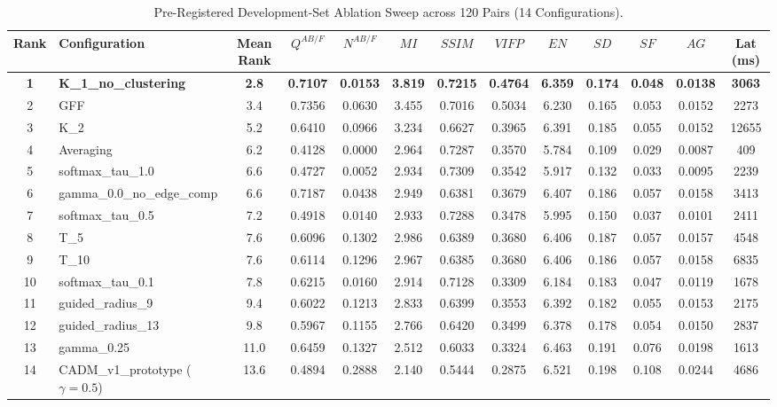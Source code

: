\documentclass[conference]{IEEEtran}
\begin{document}
\begin{table}[htbp]
\caption{Pre-Registered Development-Set Ablation Sweep across 120 Pairs (14 Configurations).}
\begin{center}
\begin{tabular}{clccccccccccc}
\toprule
\textbf{Rank} & \textbf{Configuration} & \textbf{Mean Rank} & $Q^{AB/F}$ & $N^{AB/F}$ & $MI$ & $SSIM$ & $VIFP$ & $EN$ & $SD$ & $SF$ & $AG$ & \textbf{Lat (ms)} \\
\midrule
\textbf{1} & \textbf{K\_1\_no\_clustering} & \textbf{2.8} & \textbf{0.7107} & \textbf{0.0153} & \textbf{3.819} & \textbf{0.7215} & \textbf{0.4764} & \textbf{6.359} & \textbf{0.174} & \textbf{0.048} & \textbf{0.0138} & \textbf{3063} \\
2 & GFF & 3.4 & 0.7356 & 0.0630 & 3.455 & 0.7016 & 0.5034 & 6.230 & 0.165 & 0.053 & 0.0152 & 2273 \\
3 & K\_2 & 5.2 & 0.6410 & 0.0966 & 3.234 & 0.6627 & 0.3965 & 6.391 & 0.185 & 0.055 & 0.0152 & 12655 \\
4 & Averaging & 6.2 & 0.4128 & 0.0000 & 2.964 & 0.7287 & 0.3570 & 5.784 & 0.109 & 0.029 & 0.0087 & 409 \\
5 & softmax\_tau\_1.0 & 6.6 & 0.4727 & 0.0052 & 2.934 & 0.7309 & 0.3542 & 5.917 & 0.132 & 0.033 & 0.0095 & 2239 \\
6 & gamma\_0.0\_no\_edge\_comp & 6.6 & 0.7187 & 0.0438 & 2.949 & 0.6381 & 0.3679 & 6.407 & 0.186 & 0.057 & 0.0158 & 3413 \\
7 & softmax\_tau\_0.5 & 7.2 & 0.4918 & 0.0140 & 2.933 & 0.7288 & 0.3478 & 5.995 & 0.150 & 0.037 & 0.0101 & 2411 \\
8 & T\_5 & 7.6 & 0.6096 & 0.1302 & 2.986 & 0.6389 & 0.3680 & 6.406 & 0.187 & 0.057 & 0.0157 & 4548 \\
9 & T\_10 & 7.6 & 0.6114 & 0.1296 & 2.967 & 0.6385 & 0.3680 & 6.406 & 0.186 & 0.057 & 0.0158 & 6835 \\
10 & softmax\_tau\_0.1 & 7.8 & 0.6215 & 0.0160 & 2.914 & 0.7128 & 0.3309 & 6.184 & 0.183 & 0.047 & 0.0119 & 1678 \\
11 & guided\_radius\_9 & 9.4 & 0.6022 & 0.1213 & 2.833 & 0.6399 & 0.3553 & 6.392 & 0.182 & 0.055 & 0.0153 & 2175 \\
12 & guided\_radius\_13 & 9.8 & 0.5967 & 0.1155 & 2.766 & 0.6420 & 0.3499 & 6.378 & 0.178 & 0.054 & 0.0150 & 2837 \\
13 & gamma\_0.25 & 11.0 & 0.6459 & 0.1327 & 2.512 & 0.6033 & 0.3324 & 6.463 & 0.191 & 0.076 & 0.0198 & 1613 \\
14 & CADM\_v1\_prototype ($\gamma=0.5$) & 13.6 & 0.4894 & 0.2888 & 2.140 & 0.5444 & 0.2875 & 6.521 & 0.198 & 0.108 & 0.0244 & 4686 \\
\bottomrule
\end{tabular}
\end{center}
\end{table}
\end{document}
